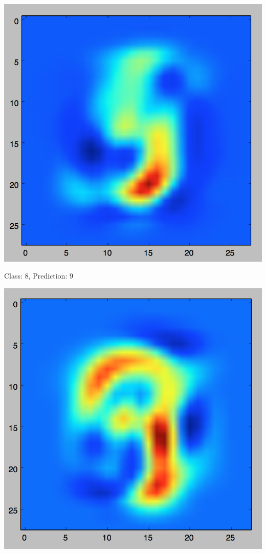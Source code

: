 \documentclass[11pt]{article}
\begin{document}
\includegraphics[scale=.3]{images/knn1_5_4.png}

Class: 8, Prediction: 9

\includegraphics[scale=.3]{images/knn1_8_9.png}
\end{document}
